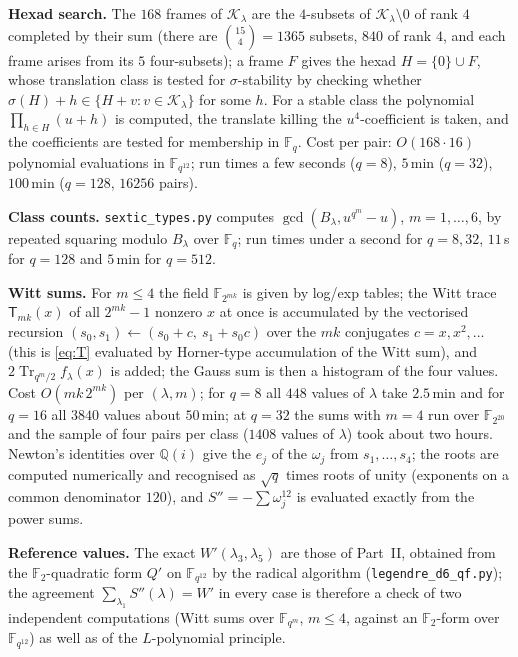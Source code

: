 ﻿\documentclass[12pt,a4paper]{amsart}
\theoremstyle{definition}
\newcommand{\F}{\mathbb{F}}
\newcommand{\Q}{\mathbb{Q}}
\newcommand{\Tr}{\operatorname{Tr}}
\newcommand{\Kk}{\mathcal{K}}
\newcommand{\Spp}{S''}
\begin{document}
\textbf{Hexad search.} The $168$ frames of $\Kk_\lambda$ are the $4$-subsets of $\Kk_\lambda\setminus0$ of rank $4$ completed by their sum (there are $\binom{15}4=1365$ subsets, $840$ of rank $4$, and each frame arises from its $5$ four-subsets); a frame $F$ gives the hexad $H=\{0\}\cup F$, whose translation class is tested for $\sigma$-stability by checking whether $\sigma(H)+h\in\{H+v:v\in\Kk_\lambda\}$ for some $h$. For a stable class the polynomial $\prod_{h\in H}(u+h)$ is computed, the translate killing the $u^4$-coefficient is taken, and the coefficients are tested for membership in $\F_q$. Cost per pair: $O(168\cdot16)$ polynomial evaluations in $\F_{q^{12}}$; run times a few seconds ($q=8$), $5$\,min ($q=32$), $100$\,min ($q=128$, $16256$ pairs).

\textbf{Class counts.} \texttt{sextic\_types.py} computes $\gcd(B_\lambda,u^{q^m}-u)$, $m=1,\dots,6$, by repeated squaring modulo $B_\lambda$ over $\F_q$; run times under a second for $q=8,32$, $11$\,s for $q=128$ and $5$\,min for $q=512$.

\textbf{Witt sums.} For $m\le4$ the field $\F_{2^{mk}}$ is given by log/exp tables; the Witt trace $\mathsf T_{mk}(x)$ of all $2^{mk}-1$ nonzero $x$ at once is accumulated by the vectorised recursion $(s_0,s_1)\leftarrow(s_0+c,\ s_1+s_0c)$ over the $mk$ conjugates $c=x,x^2,\dots$ (this is \eqref{eq:T} evaluated by Horner-type accumulation of the Witt sum), and $2\Tr_{q^m/2}f_\lambda(x)$ is added; the Gauss sum is then a histogram of the four values. Cost $O(mk\,2^{mk})$ per $(\lambda,m)$; for $q=8$ all $448$ values of $\lambda$ take $2.5$\,min and for $q=16$ all $3840$ values about $50$\,min; at $q=32$ the sums with $m=4$ run over $\F_{2^{20}}$ and the sample of four pairs per class ($1408$ values of $\lambda$) took about two hours. Newton's identities over $\Q(i)$ give the $e_j$ of the $\omega_j$ from $s_1,\dots,s_4$; the roots are computed numerically and recognised as $\sqrt q$ times roots of unity (exponents on a common denominator $120$), and $\Spp=-\sum\omega_j^{12}$ is evaluated exactly from the power sums.

\textbf{Reference values.} The exact $W'(\lambda_3,\lambda_5)$ are those of Part~II, obtained from the $\F_2$-quadratic form $Q'$ on $\F_{q^{12}}$ by the radical algorithm (\texttt{legendre\_d6\_qf.py}); the agreement $\sum_{\lambda_1}\Spp(\lambda)=W'$ in every case is therefore a check of two independent computations (Witt sums over $\F_{q^m}$, $m\le4$, against an $\F_2$-form over $\F_{q^{12}}$) as well as of the $L$-polynomial principle.
\end{document}
